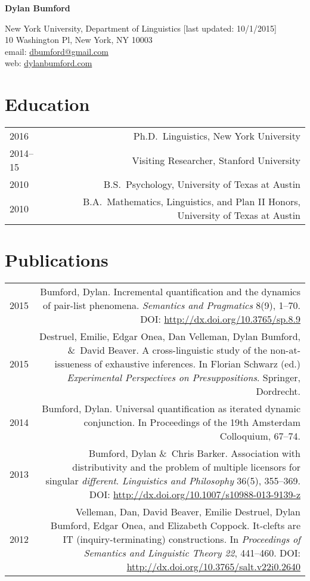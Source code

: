 \documentclass[11pt]{article}
\newcommand{\doi}[1]{\url{http://dx.doi.org/#1}}
\newcommand{\with}{\&}
\begin{document}
\textbf{Dylan Bumford}

\bigskip

New York University, Department of Linguistics\hfill
{\color{gray}[last updated: 10/1/2015]}\\
10 Washington Pl, New York, NY 10003\\
email: \href{mailto:dbumford@gmail.com}{dbumford@gmail.com}\\
web: \url{dylanbumford.com}

\bigskip

\section*{Education}

\begin{longtable}{LR}
  2016        & Ph.D.~Linguistics, New York University\\
  2014--15    & Visiting Researcher, Stanford University\\
  2010        & B.S.~Psychology, University of Texas at Austin\\
  2010        & B.A.~Mathematics, Linguistics, and Plan II Honors, University of
                Texas at Austin
\end{longtable}

\section*{Publications}

\begin{longtable}{LR}
  2015 & Bumford, Dylan. Incremental quantification and the dynamics of
         pair-list phenomena. \textit{Semantics and Pragmatics} 8(9), 1--70.
         DOI: \doi{10.3765/sp.8.9}\\
  2015 & Destruel, Emilie, Edgar Onea, Dan Velleman, Dylan Bumford,
         \with~David Beaver. A cross-linguistic study of the non-at-issueness
         of exhaustive inferences. In Florian Schwarz (ed.)
         \textit{Experimental Perspectives on Presuppositions}. Springer,
         Dordrecht.\\
  2014 & Bumford, Dylan. Universal quantification as iterated dynamic
         conjunction. In {Proceedings of the 19th Amsterdam Colloquium},
         67--74.\\
  2013 & Bumford, Dylan \with~Chris Barker. Association with distributivity
         and the problem of multiple licensors for singular
         \textit{different}. \textit{Linguistics and Philosophy} 36(5),
         355--369. DOI: \doi{10.1007/s10988-013-9139-z}\\ %
  2012 & Velleman, Dan, David Beaver, Emilie Destruel, Dylan Bumford, Edgar
         Onea, and Elizabeth Coppock. It-clefts are IT (inquiry-terminating)
         constructions. In \textit{Proceedings of Semantics and Linguistic
         Theory 22}, 441--460. DOI: \doi{10.3765/salt.v22i0.2640}
\end{longtable}
\end{document}
